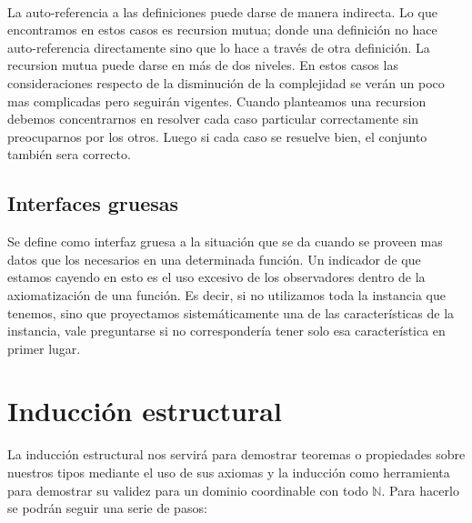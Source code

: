 ~

La auto-referencia a las definiciones puede darse de manera indirecta. Lo que encontramos en estos casos es recursion mutua; donde una definici\'on no hace auto-referencia directamente sino que lo hace a trav\'es de otra definici\'on. La recursion mutua puede darse en m\'as de dos niveles. En estos casos las consideraciones respecto de la disminuci\'on de la complejidad se ver\'an un poco mas complicadas pero seguir\'an vigentes. Cuando planteamos una recursion debemos concentrarnos en resolver cada caso particular correctamente sin preocuparnos por los otros. Luego si cada caso se resuelve bien, el conjunto tambi\'en sera correcto.

\subsection{Interfaces gruesas}

Se define como interfaz gruesa a la situaci\'on que se da cuando se proveen mas datos que los necesarios en una determinada funci\'on. Un indicador de que estamos cayendo en esto es el uso excesivo de los observadores dentro de la axiomatizaci\'on de una funci\'on. Es decir, si no utilizamos toda la instancia que tenemos, sino que proyectamos sistem\'aticamente una de las caracter\'isticas de la instancia, vale preguntarse si no corresponder\'ia tener solo esa caracter\'istica en primer lugar.

\newpage
\section{Inducci\'on estructural}

La inducci\'on estructural nos servir\'a para demostrar teoremas o propiedades sobre nuestros tipos mediante el uso de sus axiomas y la inducci\'on como herramienta para demostrar su validez para un dominio coordinable con todo $\mathbb{N}$. Para hacerlo se podr\'an seguir una serie de pasos:

